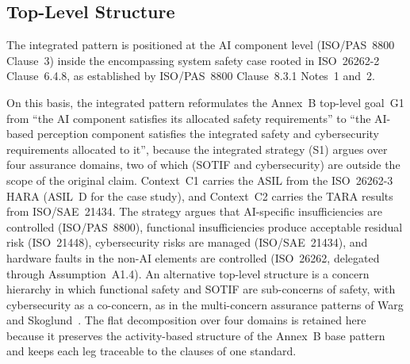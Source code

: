 \documentclass[runningheads]{llncs}
\newcommand{\crev}[1]{\textcolor{blue!75!black}{#1}}
\newcommand{\crev}[1]{#1}
\begin{document}
	\subsection{Top-Level Structure}
	\label{sec:toplevel}
	
	The integrated pattern is positioned at the AI component level (ISO/PAS~8800 Clause~3) inside the encompassing system safety case rooted in ISO~26262-2 Clause~6.4.8, as established by ISO/PAS~8800 Clause~8.3.1 Notes~1 and~2.
	
	On this basis, the integrated pattern reformulates the Annex~B top-level goal~G1 from ``the AI component satisfies its allocated safety requirements'' to ``the AI-based perception component satisfies the integrated safety and cybersecurity requirements allocated to it'', because the integrated strategy (S1) argues over four assurance domains, two of which (SOTIF and cybersecurity) are outside the scope of the original claim. Context~C1 carries the ASIL from the ISO~26262-3 HARA (ASIL~D for the case study), and Context~C2 carries the TARA results from ISO/SAE~21434. The strategy argues that AI-specific insufficiencies are controlled (ISO/PAS~8800), functional insufficiencies produce acceptable residual risk (ISO~21448), cybersecurity risks are managed (ISO/SAE~21434), and hardware faults in the non-AI elements are controlled (ISO~26262, delegated through Assumption~A1.4). \crev{An alternative top-level structure is a concern hierarchy in which functional safety and SOTIF are sub-concerns of safety, with cybersecurity as a co-concern, as in the multi-concern assurance patterns of Warg and Skoglund~\cite{Warg2019}. The flat decomposition over four domains is retained here because it preserves the activity-based structure of the Annex~B base pattern and keeps each leg traceable to the clauses of one standard.}
	
\end{document}
